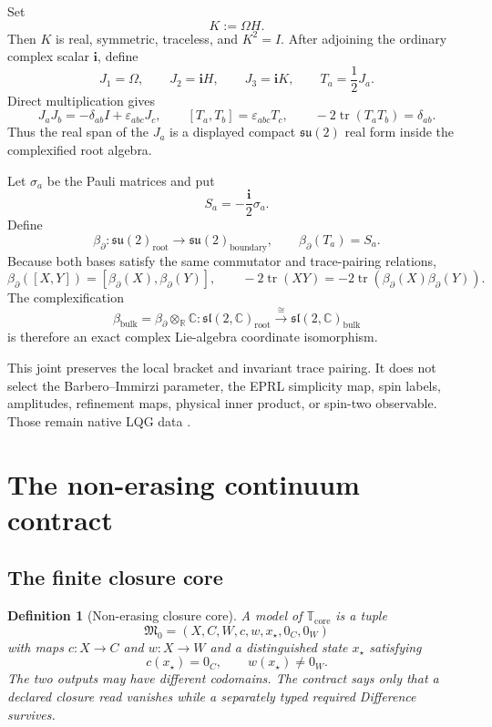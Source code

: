 \documentclass[11pt]{article}
\newtheorem{definition}[theorem]{Definition}
\newcommand{\R}{\mathbb R}
\newcommand{\C}{\mathbb C}
\newcommand{\tr}{\operatorname{tr}}
\newcommand{\NECore}{\mathbb T_{\mathrm{core}}}
\begin{document}
Set
\[
K:=\Omega H.
\]
Then $K$ is real, symmetric, traceless, and $K^2=I$. After adjoining the ordinary complex scalar $\mathbf i$, define
\[
J_1=\Omega,
\qquad
J_2=\mathbf i H,
\qquad
J_3=\mathbf i K,
\qquad
T_a=\frac12J_a.
\]
Direct multiplication gives
\[
J_aJ_b=-\delta_{ab}I+\varepsilon_{abc}J_c,
\qquad
[T_a,T_b]=\varepsilon_{abc}T_c,
\qquad
-2\tr(T_aT_b)=\delta_{ab}.
\]
Thus the real span of the $J_a$ is a displayed compact $\mathfrak{su}(2)$ real form inside the complexified root algebra.

Let $\sigma_a$ be the Pauli matrices and put
\[
S_a=-\frac{\mathbf i}{2}\sigma_a.
\]
Define
\[
\boxed{
\beta_{\partial}:\mathfrak{su}(2)_{\mathrm{root}}\longrightarrow
\mathfrak{su}(2)_{\mathrm{boundary}},
\qquad
\beta_{\partial}(T_a)=S_a.
}
\]
Because both bases satisfy the same commutator and trace-pairing relations,
\[
\boxed{
\beta_{\partial}([X,Y])=[\beta_{\partial}(X),\beta_{\partial}(Y)],
\qquad
-2\tr(XY)=-2\tr(\beta_{\partial}(X)\beta_{\partial}(Y)).
}
\]
The complexification
\[
\boxed{
\beta_{\mathrm{bulk}}
=\beta_{\partial}\otimes_{\R}\C:
\mathfrak{sl}(2,\C)_{\mathrm{root}}
\overset{\cong}{\longrightarrow}
\mathfrak{sl}(2,\C)_{\mathrm{bulk}}
}
\]
is therefore an exact complex Lie-algebra coordinate isomorphism.

This joint preserves the local bracket and invariant trace pairing. It does not select the Barbero--Immirzi parameter, the EPRL simplicity map, spin labels, amplitudes, refinement maps, physical inner product, or spin-two observable. Those remain native LQG data \cite{CoppaGaugeSpine2026,CoppaCCLQG2026}.

\section{The non-erasing continuum contract}

\subsection{The finite closure core}

\begin{definition}[Non-erasing closure core]
A model of $\NECore$ is a tuple
\[
\mathfrak M_0=(X,C,W,c,w,x_\star,0_C,0_W)
\]
with maps $c:X\to C$ and $w:X\to W$ and a distinguished state $x_\star$ satisfying
\[
\boxed{c(x_\star)=0_C,
\qquad
w(x_\star)\neq0_W.}
\]
The two outputs may have different codomains. The contract says only that a declared closure read vanishes while a separately typed required Difference survives.
\end{definition}
\end{document}

